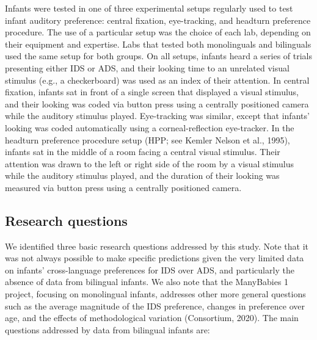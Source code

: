 \documentclass[,man,floatsintext]{apa6}
\begin{document}
Infants were tested in one of three experimental setups regularly used to test infant auditory preference: central fixation, eye-tracking, and headturn preference procedure. The use of a particular setup was the choice of each lab, depending on their equipment and expertise. Labs that tested both monolinguals and bilinguals used the same setup for both groups. On all setups, infants heard a series of trials presenting either IDS or ADS, and their looking time to an unrelated visual stimulus (e.g., a checkerboard) was used as an index of their attention. In central fixation, infants sat in front of a single screen that displayed a visual stimulus, and their looking was coded via button press using a centrally positioned camera while the auditory stimulus played. Eye-tracking was similar, except that infants' looking was coded automatically using a corneal-reflection eye-tracker. In the headturn preference procedure setup (HPP; see Kemler Nelson et al., 1995), infants sat in the middle of a room facing a central visual stimulus. Their attention was drawn to the left or right side of the room by a visual stimulus while the auditory stimulus played, and the duration of their looking was measured via button press using a centrally positioned camera.

\hypertarget{research-questions}{%
\subsection{Research questions}\label{research-questions}}

We identified three basic research questions addressed by this study. Note that it was not always possible to make specific predictions given the very limited data on infants' cross-language preferences for IDS over ADS, and particularly the absence of data from bilingual infants. We also note that the ManyBabies 1 project, focusing on monolingual infants, addresses other more general questions such as the average magnitude of the IDS preference, changes in preference over age, and the effects of methodological variation (Consortium, 2020). The main questions addressed by data from bilingual infants are:
\end{document}
